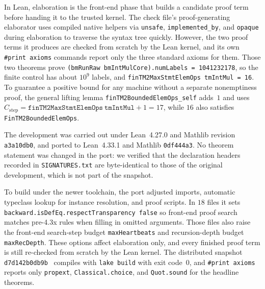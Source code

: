 {\sloppy In Lean, elaboration is the front-end phase that builds a candidate proof term before handing it to the trusted kernel. The check file's proof-generating elaborator uses compiled native helpers via \texttt{unsafe}, \texttt{implemented\_by}, and \texttt{opaque} during elaboration to traverse the syntax tree quickly. However, the two proof terms it produces are checked from scratch by the Lean kernel, and its own \texttt{\#print axioms} commands report only the three standard axioms for them. Those two theorems prove \texttt{(bmRunRaw\allowbreak\ bmIntMulCore).\allowbreak numLabels = 1041232178}, so the finite control has about $10^9$ labels, and \texttt{finTM2\allowbreak MaxStmt\allowbreak ElemOps\allowbreak\ tmIntMul = 16}. To guarantee a positive bound for any machine without a separate nonemptiness proof, the general lifting lemma \texttt{finTM2\allowbreak Bounded\allowbreak ElemOps\_\allowbreak self} adds~$1$ and uses $C_{\mathrm{step}} = \texttt{finTM2MaxStmtElemOps}\ \texttt{tmIntMul} + 1 = 17$, while $16$ also satisfies \texttt{FinTM2BoundedElemOps}.\par}

The development was carried out under Lean~4.27.0 and Mathlib revision \texttt{a3a10db0}, and ported to Lean~4.33.1 and Mathlib \texttt{0df444a3}. No theorem statement was changed in the port: we verified that the declaration headers recorded in \texttt{SIGNATURES.txt} are byte-identical to those of the original development, which is not part of the snapshot.

To build under the newer toolchain, the port adjusted imports, automatic typeclass lookup for instance resolution, and proof scripts. In $18$ files it sets \texttt{backward.\allowbreak isDefEq.\allowbreak respectTransparency false} so front-end proof search matches pre-4.3x rules when filling in omitted arguments. Those files also raise the front-end search-step budget \texttt{maxHeartbeats} and recursion-depth budget \texttt{maxRecDepth}. These options affect elaboration only, and every finished proof term is still re-checked from scratch by the Lean kernel. The distributed snapshot \texttt{d7d142b0db9b}~\cite{LeanMS26} compiles with \texttt{lake build} with exit code~$0$, and \texttt{\#print axioms} reports only \texttt{propext}, \texttt{Classical.choice}, and \texttt{Quot.sound} for the headline theorems.

